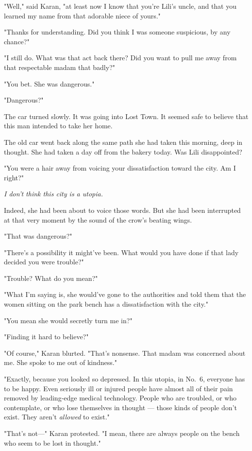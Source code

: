 "Well," said Karan, "at least now I know that you're Lili's uncle, and
that you learned my name from that adorable niece of yours."

"Thanks for understanding. Did you think I was someone suspicious, by
any chance?"

"I still do. What was that act back there? Did you want to pull me away
from that respectable madam that badly?"

"You bet. She was dangerous."

"Dangerous?"

The car turned slowly. It was going into Lost Town. It seemed safe to
believe that this man intended to take her home.

The old car went back along the same path she had taken this morning,
deep in thought. She had taken a day off from the bakery today. Was Lili
disappointed?

"You were a hair away from voicing your dissatisfaction toward the city.
Am I right?"

\emph{I don't think this city is a utopia.}

Indeed, she had been about to voice those words. But she had been
interrupted at that very moment by the sound of the crow's beating
wings.

"That was dangerous?"

"There's a possibility it might've been. What would you have done if
that lady decided you were trouble?"

"Trouble? What do you mean?"

"What I'm saying is, she would've gone to the authorities and told them
that the women sitting on the park bench has a dissatisfaction with the
city."

"You mean she would secretly turn me in?"

"Finding it hard to believe?"

"Of course," Karan blurted. "That's nonsense. That madam was concerned
about me. She spoke to me out of kindness."

"Exactly, because you looked so depressed. In this utopia, in No.~6,
everyone has to be happy. Even seriously ill or injured people have
almost all of their pain removed by leading-edge medical technology.
People who are troubled, or who contemplate, or who lose themselves in
thought --- those kinds of people don't exist. They aren't \emph{allowed} to
exist."

"That's not---" Karan protested. "I mean, there are always people on the
bench who seem to be lost in thought."

